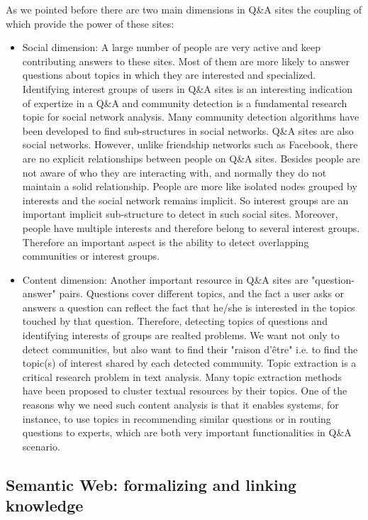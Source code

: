 As we pointed before there are two main dimensions in Q\&A sites the coupling of which provide the power of these sites:
\begin{itemize}
\item{Social dimension:} 
A large number of people are very active and keep contributing answers to these sites. Most of them are more likely to answer questions about topics in which they are interested and specialized. Identifying interest groups of users in Q\&A sites is an interesting indication of expertize in a Q\&A and community detection is a fundamental research topic for social network analysis. Many community detection algorithms have been developed to find sub-structures in social networks. Q\&A sites are also social networks. However, unlike friendship networks such as Facebook, there are no explicit relationships between people on Q\&A sites. Besides people are not aware of who they are interacting with, and normally they do not maintain a solid relationship. People are more like isolated nodes grouped by interests and the social network remains implicit. So interest groups are an important implicit sub-structure to detect in such social sites. Moreover, people have multiple interests and therefore belong to several interest groups. Therefore an important aspect is the ability to detect overlapping communities or interest groups. 

\item{Content dimension:}
Another important resource in Q\&A sites are "question-answer" pairs. Questions cover different topics, and the fact a user asks or answers a question can reflect the fact that he/she is interested in the topics touched by that question. Therefore, detecting topics of questions and identifying interests of groups are realted problems. We want not only to detect communities, but also want to find their "raison d'\^etre" i.e. to find the topic(s) of interest shared by each detected community. Topic extraction is a critical research problem in text analysis. Many topic extraction methods have been proposed to cluster textual resources by their topics. One of the reasons why we need such content analysis is that it enables systems, for instance, to use topics in recommending similar questions or in routing questions to experts, which are both very important functionalities in Q\&A scenario.

\end{itemize}

\subsection{Semantic Web: formalizing and linking knowledge}

